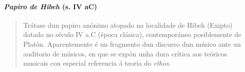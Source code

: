 
\paragraph{\texorpdfstring{\emph{Papiro de Hibeh} (s. IV
aC)}{Papiro de Hibeh (s. IV aC)}}\label{papiro-de-hibeh--s.-iv-ac}

\begin{quote}
Trátase dun papiro anónimo atopado na localidade de Hibeh (Exipto) datado no século {\small IV} a.C (época clásica), contemporáneo posiblemente de Platón. Aparentemente é un fragmento dun discurso dun músico ante un auditorio de músicos, en que se expón unha dura crítica aos teóricos musicais con especial referencia á teoría do \emph{ethos}.
\end{quote}


